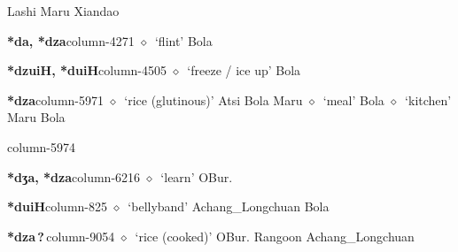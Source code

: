          Lashi 
\hspace{1ex}
         Maru 
\hspace{1ex}
         Xiandao 
  \item {\footnotesize \textbf{*da, *dza}}{\tiny column-4271}
         $\diamond$~`flint'
         Bola 
  \item {\footnotesize \textbf{*dzuiH, *duiH}}{\tiny column-4505}
         $\diamond$~`freeze / ice up'
         Bola 
  \item {\footnotesize \textbf{*dza}}{\tiny column-5971}
         $\diamond$~`rice (glutinous)'
         Atsi 
\hspace{1ex}
         Bola 
\hspace{1ex}
         Maru 
\hspace{1ex}
         $\diamond$~`meal'
         Bola 
\hspace{1ex}
         $\diamond$~`kitchen'
         Maru 
\hspace{1ex}
         Bola 
  \item {\footnotesize \textbf{}}{\tiny column-5974}
  \item {\footnotesize \textbf{*dʒa, *dza}}{\tiny column-6216}
         $\diamond$~`learn'
         OBur. 
  \item {\footnotesize \textbf{*duiH}}{\tiny column-825}
         $\diamond$~`bellyband'
         Achang\_Longchuan 
\hspace{1ex}
         Bola 
  \item {\footnotesize \textbf{*dza\,?\,}}{\tiny column-9054}
         $\diamond$~`rice (cooked)'
         OBur. 
\hspace{1ex}
         Rangoon 
\hspace{1ex}
         Achang\_Longchuan 
